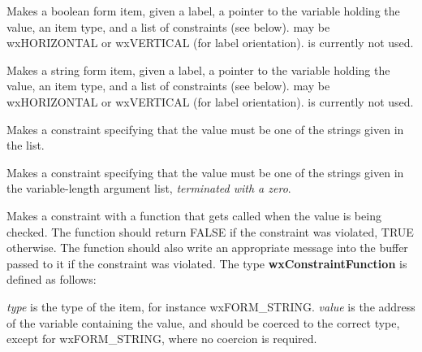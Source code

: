 Makes a boolean form item, given a label, a pointer to the variable
holding the value, an item type, and a list of constraints (see below).
 may be wxHORIZONTAL or wxVERTICAL (for label orientation).
 is currently not used.


Makes a string form item, given a label, a pointer to the variable
holding the value, an item type, and a list of constraints (see below).
 may be wxHORIZONTAL or wxVERTICAL (for label orientation).
 is currently not used.


Makes a constraint specifying that the value must be one of the strings
given in the list.


Makes a constraint specifying that the value must be one of the strings
given in the variable-length argument list, {\it terminated with a zero}.


Makes a constraint with a function that gets called when the value is
being checked. The function should return FALSE if the constraint was
violated, TRUE otherwise.  The function should also write an appropriate
message into the buffer passed to it if the constraint was violated.
The type {\bf wxConstraintFunction} is defined as follows:


{\it type} is the type of the item, for instance wxFORM\_STRING. {\it value} is
the address of the variable containing the value, and should be coerced
to the correct type, except for wxFORM\_STRING, where no coercion is required.

